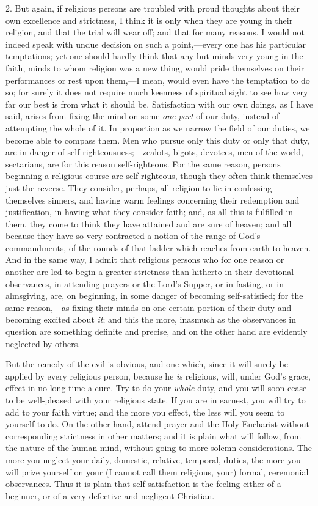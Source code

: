 2. But again, if religious persons are troubled with proud thoughts
about their own excellence and strictness, I think it is only when
they are young in their religion, and that the trial will wear off;
and that for many reasons. I would not indeed speak with undue
decision on such a point,—every one has his particular temptations;
yet one should hardly think that any but minds very young in the
faith, minds to whom religion was a new thing, would pride themselves
on their performances or rest upon them,—I mean, would even have the
temptation to do so; for surely it does not require much keenness of
spiritual sight to see how very far our best is from what it should
be. Satisfaction with our own doings, as I have said, arises from
fixing the mind on some \emph{one part} of our duty, instead of
attempting the whole of it. In proportion as we narrow the field of
our duties, we become able to compass them. Men who pursue only this
duty or only that duty, are in danger of self-righteousness;—zealots,
bigots, devotees, men of the world, sectarians, are for this reason
self-righteous. For the same reason, persons beginning a religious
course are self-righteous, though they often think themselves just the
reverse. They consider, perhaps, all religion to lie in confessing
themselves sinners, and having warm feelings concerning their
redemption and justification, in having what they consider faith; and,
as all this is fulfilled in them, they come to think they have
attained and are sure of heaven; and all because they have so very
contracted a notion of the range of God's commandments, of the rounds
of that ladder which reaches from earth to heaven. And in the same
way, I admit that religious persons who for one reason or another are
led to begin a greater strictness than hitherto in their devotional
observances, in attending prayers or the Lord's Supper, or in fasting,
or in almsgiving, are, on beginning, in some danger of becoming
self-satisfied; for the same reason,—as fixing their minds on one
certain portion of their duty and becoming excited about \emph{it};
and this the more, inasmuch as the observances in question are
something definite and precise, and on the other hand are evidently
neglected by others.

But the remedy of the evil is obvious, and one which, since it will
surely be applied by every religious person, because he \emph{is} religious,
will, under God's grace, effect in no long time a cure. Try to do your
\emph{whole} duty, and you will soon cease to be well-pleased with
your religious state. If you are in earnest, you will try to add to
your faith virtue; and the more you effect, the less will you seem to
yourself to do. On the other hand, attend prayer and the Holy
Eucharist without corresponding strictness in other matters; and it is
plain what will follow, from the nature of the human mind, without
going to more solemn considerations. The more you neglect your daily,
domestic, relative, temporal, duties, the more you will prize yourself
on your (I cannot call them religious, your) formal, ceremonial
observances. Thus it is plain that self-satisfaction is the feeling
either of a beginner, or of a very defective and negligent Christian.

